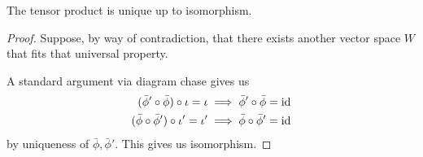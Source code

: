 \begin{theorem}
    The tensor product is unique up to isomorphism.
\end{theorem}
\begin{proof}
    Suppose, by way of contradiction, that there exists another vector space \(W\)
    that fits that universal property.
    \begin{center}
    \end{center}
    A standard argument via diagram chase gives us
    \begin{align*}
        (\bar{\phi}'\circ\bar{\phi})\circ\iota = \iota &\implies \bar{\phi}'\circ\bar{\phi} = \operatorname{id} \\
        (\bar{\phi}\circ\bar{\phi}')\circ\iota' = \iota' &\implies \bar{\phi}\circ\bar{\phi}' = \operatorname{id}
    \end{align*}
    by uniqueness of \(\bar{\phi},\bar{\phi}'\).
    This gives us isomorphism.
\end{proof}

